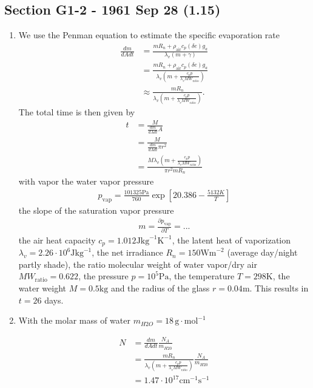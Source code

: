 \documentclass[10pt,a4paper]{book}
\theoremstyle{definition}
\begin{document}
\subsection{Section G1-2 - 1961 Sep 28 (1.15)}
\begin{enumerate}[label=(\alph*)]
\item  We use the Penman equation to estimate the specific evaporation rate
\begin{align}
    \frac{dm}{dA dt}
    &=\frac{m R_n + \rho_\text{air}c_p (\delta e)g_a}{\lambda_v(m+\gamma)}\\
    &=\frac{m R_n + \rho_\text{air}c_p (\delta e)g_a}{\lambda_v(m+\frac{c_p p}{\lambda_v MW_\text{ratio}})}\\
    &\approx\frac{m R_n}{\lambda_v(m+\frac{c_p p}{\lambda_v MW_\text{ratio}})}.
\end{align}
The total time is then given by
\begin{align}
    t&=\frac{M}{\frac{dm}{dA dt}A}\\
    &=\frac{M}{\frac{dm}{dA dt}\pi r^2}\\
    &=\frac{M\lambda_v(m+\frac{c_p p}{\lambda_v MW_\text{ratio}})}{\pi r^2 m R_n }
\end{align}
with vapor the water vapor pressure
\begin{align}
    p_\text{vap}=\frac{101325\text{Pa}}{760} \exp\left[20.386 - \frac{5132K}{T}\right]
\end{align}
the slope of the saturation vapor pressure
\begin{align}
    m=\frac{\partial p_\text{vap}}{\partial T}=...
\end{align}
the air heat capacity $c_p=1.012\text{J}\text{kg}^{-1}\text{K}^{-1}$, the latent heat of vaporization $\lambda_v=2.26\cdot10^6 \text{J}\text{kg}^{-1}$, the net irradiance $R_n=150\text{Wm}^{-2}$ (average day/night partly shade), the ratio molecular weight of water vapor/dry air $MW_\text{ratio}=0.622$, the pressure $p=10^5\text{Pa}$, the temperature $T= 298\text{K}$, the water weight $M=0.5\text{kg}$ and the radius of the glass $r=0.04\text{m}$. This results in $t=26$ days.

\item With the molar mass of water $m_{H2O}=18\,\text{g}\cdot\text{mol}^{-1}$

\begin{align}
    N&=\frac{dm}{dA dt} \frac{N_A}{m_{H20}}\\
    &=\frac{m R_n}{\lambda_v(m+\frac{c_p p}{\lambda_v MW_\text{ratio}})}\frac{N_A}{m_{H20}}\\
    &=1.47\cdot10^{17}\text{cm}^{-1}\text{s}^{-1}
\end{align}


\end{enumerate}
\end{document}
